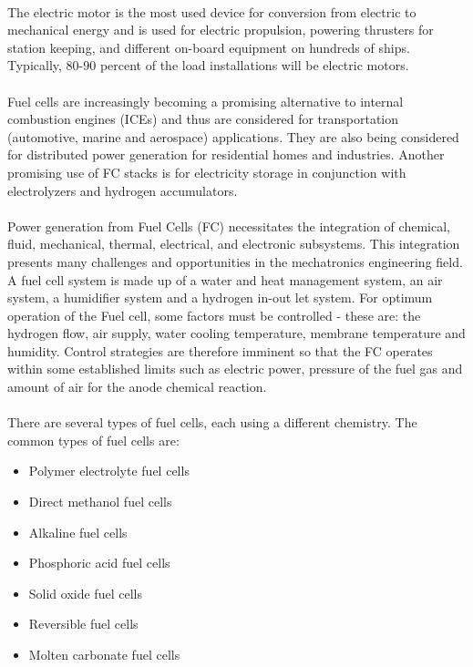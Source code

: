 \paragraph{}The  electric motor is the most used device for conversion from electric to mechanical energy and is used for electric propulsion,  powering thrusters for station keeping, and different on-board equipment on hundreds of ships. Typically, 80-90 percent of the load installations will be electric motors.

\paragraph{}Fuel cells are increasingly becoming a promising alternative to internal combustion engines (ICEs) and thus are considered for transportation (automotive, marine and aerospace) applications. They are also being considered for distributed power generation for residential homes and industries. Another promising use of FC stacks is for electricity storage in conjunction with electrolyzers and hydrogen accumulators.\cite{stefanopoulou_mechatronics_nodate}
\paragraph{}Power generation from Fuel Cells (FC) necessitates the integration of chemical, fluid,
mechanical, thermal, electrical, and electronic subsystems. This integration presents many
challenges and opportunities in the mechatronics engineering field. A fuel cell system is made up of a water and heat management system, an air system, a humidifier system and a hydrogen in-out let system. For optimum operation of the Fuel cell, some factors must be controlled - these are: the hydrogen flow, air supply, water cooling temperature, membrane temperature and humidity. Control strategies are therefore imminent so that the FC operates within some established limits such as electric power, pressure of the fuel gas and amount of air for the anode chemical reaction.
\paragraph{}There are several types of fuel cells, each using a different chemistry. The common types of fuel cells are:
\begin{itemize}
\item Polymer electrolyte fuel cells
\item Direct methanol fuel cells
\item Alkaline fuel cells
\item Phosphoric acid fuel cells
\item Solid oxide fuel cells
\item Reversible fuel cells
\item Molten carbonate fuel cells
\end{itemize}
